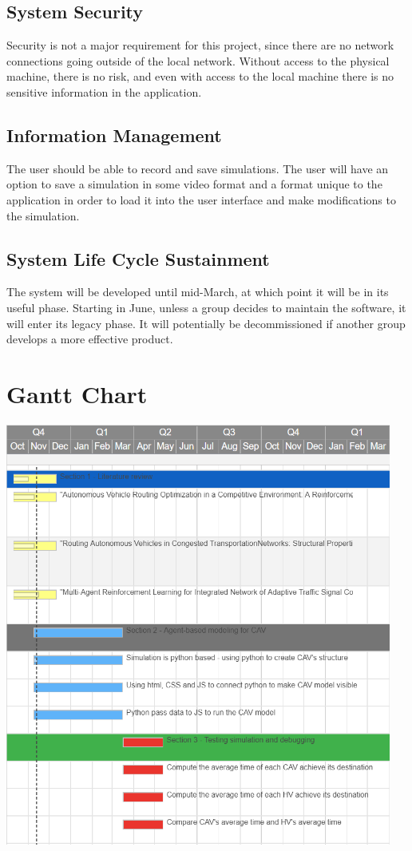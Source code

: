 \documentclass[onecolumn, draftclsnofoot,10pt, compsoc]{IEEEtran}
\begin{document}
\subsection{System Security}
Security is not a major requirement for this project, since there are no network connections going outside of the local network.
Without access to the physical machine, there is no risk, and even with access to the local machine there is no sensitive information in the application.
\subsection{Information Management}
The user should be able to record and save simulations.
The user will have an option to save a simulation in some video format and a format unique to the application in order to load it into the user interface and make modifications to the simulation.
\subsection{System Life Cycle Sustainment}
The system will be developed until mid-March, at which point it will be in its useful phase.
Starting in June, unless a group decides to maintain the software, it will enter its legacy phase.
It will potentially be decommissioned if another group develops a more effective product.
\section{Gantt Chart}
\includegraphics[width=5in]{gantt_chart}
\end{document}
